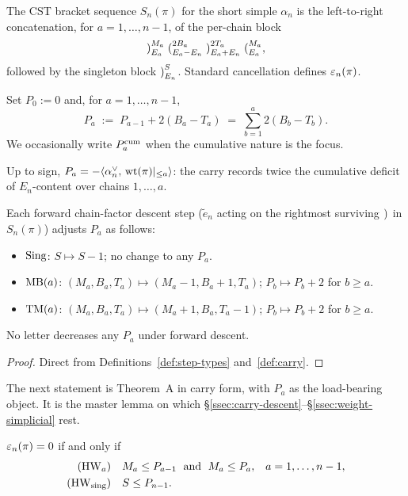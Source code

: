 The CST bracket sequence $S_n(\pi)$ for the short simple $\alpha_n$ is the
left-to-right concatenation, for $a = 1, \dots, n-1$, of the per-chain block
\[
   {)}_{E_a}^{M_a}\;{(}_{E_a - E_n}^{2 B_a}\;{)}_{E_a + E_n}^{2 T_a}\;{(}_{E_a}^{M_a},
\]
followed by the singleton block ${)}_{E_n}^{S}$. Standard cancellation defines
$\varepsilon_n(\pi)$.

\begin{definition}\label{def:carry}
Set $P_0 := 0$ and, for $a = 1, \dots, n-1$,
\[
   P_a \;:=\; P_{a-1} + 2(B_a - T_a) \;=\; \sum_{b=1}^{a} 2(B_b - T_b).
\]
We occasionally write $P^{\mathrm{cum}}_a$ when the cumulative nature is the focus.
\end{definition}

Up to sign, $P_a = -\langle \alpha_n^\vee,\, \operatorname{wt}(\pi)|_{\le a}\rangle$: the carry
records twice the cumulative deficit of $E_n$-content over chains $1, \dots, a$.

\begin{lemma}\label{lem:carry-mono}
Each forward chain-factor descent step ($\widetilde{e}_n$ acting on the rightmost
surviving ${)}_{}$ in $S_n(\pi)$) adjusts $P_a$ as follows:
\begin{itemize}[leftmargin=2em]
  \item $\mathrm{Sing}$: $S \mapsto S - 1$; no change to any $P_a$.
  \item $\mathrm{MB}(a)$: $(M_a, B_a, T_a) \mapsto (M_a - 1, B_a + 1, T_a)$; $P_b \mapsto P_b + 2$ for $b \ge a$.
  \item $\mathrm{TM}(a)$: $(M_a, B_a, T_a) \mapsto (M_a + 1, B_a, T_a - 1)$; $P_b \mapsto P_b + 2$ for $b \ge a$.
\end{itemize}
No letter decreases any $P_a$ under forward descent.
\end{lemma}

\begin{proof}
Direct from Definitions~\ref{def:step-types} and~\ref{def:carry}.
\end{proof}

The next statement is Theorem~A in carry form, with $P_a$ as the load-bearing
object. It is the master lemma on which \S\ref{ssec:carry-descent}--\S\ref{ssec:weight-simplicial} rest.

\begin{theorem}\label{thm:carry-A}
$\varepsilon_n(\pi) = 0$ if and only if
\begin{align}
   (\mathrm{HW}_a) \quad & M_a \le P_{a-1} \;\text{ and }\; M_a \le P_a,
   && a = 1, \dots, n-1, \label{eq:carry-HWa}\\
   (\mathrm{HW}_{\mathrm{sing}}) \quad & S \le P_{n-1}. \label{eq:carry-HWsing}
\end{align}
\end{theorem}

